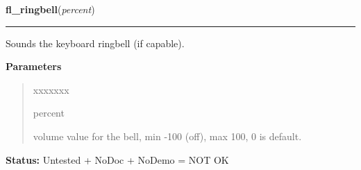     \label{xformslib:library:fl_ringbell}

    \vspace{0.5ex}

\hspace{.8\funcindent}\begin{boxedminipage}{\funcwidth}

    \raggedright \textbf{fl\_ringbell}(\textit{percent})

    \vspace{-1.5ex}

    \rule{\textwidth}{0.5\fboxrule}
\setlength{\parskip}{2ex}
    Sounds the keyboard ringbell (if capable).

\setlength{\parskip}{1ex}
      \textbf{Parameters}
      \vspace{-1ex}

      \begin{quote}
        \begin{Ventry}{xxxxxxx}

          \item[percent]

          volume value for the bell, min -100 (off), max  100, 0 is 
          default.

        \end{Ventry}

      \end{quote}

\textbf{Status:} Untested + NoDoc + NoDemo = NOT OK



    \end{boxedminipage}

    \label{xformslib:library:fl_gettime}

    \vspace{0.5ex}


